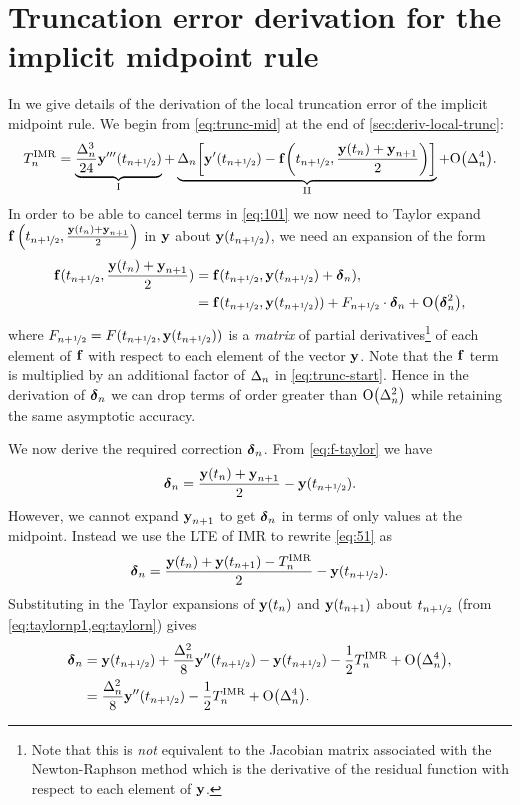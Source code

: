 \chapter{Truncation error derivation for the implicit midpoint rule}
\label{sec:full-imr-lte-calculation}

In  we give details of the derivation of the local truncation error of the implicit midpoint rule.
We begin from \cref{eq:trunc-mid} at the end of \cref{sec:deriv-local-trunc}:
\begin{equation}
  \lte^\imr = \underbrace{\frac{\dtn^3}{24} \yvhf[''']}_{\text{I}}
  + \underbrace{\dtn\bigs{ \yvhf['] - \ffv{\thf, \frac{\yv(t_n) + \yv_{n+1}}{2}} }}_{\text{II}}
  + \order{\dtn^4}.
  \label{eq:101}
\end{equation}
In order to be able to cancel terms in \cref{eq:101} we now need to Taylor expand ${\boldsymbol{\mathrm{f}}}\left( t_{n+\nicefrac{1}{2}}, \frac{\boldsymbol{\mathrm{y}}(t_n) + \boldsymbol{\mathrm{y}}_{n+1}}{2} \right)$ in $\boldsymbol{\mathrm{y}}$ about $\boldsymbol{\mathrm{y}}(t_{n+\nicefrac{1}{2}})$, \ie we need an expansion of the form
\begin{equation}
  \begin{aligned}
    \fv(\thf, \frac{\yv(t_n) + \yv_{n+1}}{2}) &= \fv(\thf, \yvhf + \dyn), \\
    &= \fv(\thf, \yvhf) + \dfdyhf \cdot \dyn  + \order{\dyn^2},
    \label{eq:f-taylor}
  \end{aligned}
\end{equation}
where $F_{n+\nicefrac{1}{2}} = F(t_{n+\nicefrac{1}{2}}, \boldsymbol{\mathrm{y}}(t_{n+\nicefrac{1}{2}}))$ is a \emph{matrix} of partial derivatives\footnote{Note that this is \emph{not} equivalent to the Jacobian matrix associated with the Newton-Raphson method which is the derivative of the residual function with respect to each element of $\boldsymbol{\mathrm{y}}$.} of each element of ${\boldsymbol{\mathrm{f}}}$ with respect to each element of the vector $\boldsymbol{\mathrm{y}}$.
Note that the ${\boldsymbol{\mathrm{f}}}$ term is multiplied by an additional factor of $\Delta_{n}$ in \cref{eq:trunc-start}.
Hence in the derivation of $\mbox{\boldmath$\delta$}_{n}$ we can drop terms of order greater than $\mathrm{O}{\left( \Delta_{n}^2 \right)}$ while retaining the same asymptotic accuracy.

We now derive the required correction $\mbox{\boldmath$\delta$}_{n}$.
From \cref{eq:f-taylor} we have
\begin{equation}
  \dyn = \frac{\yv(t_n) + \yv_{n+1}}{2} - \yvhf.
  \label{eq:51}
\end{equation}
However, we cannot expand $\boldsymbol{\mathrm{y}}_{n+1}$ to get $\mbox{\boldmath$\delta$}_{n}$ in terms of only values at the midpoint.
Instead we use the LTE of IMR to rewrite \cref{eq:51} as
\begin{equation}
  \mbox{\boldmath$\delta$}_{n} = \frac{\boldsymbol{\mathrm{y}}(t_n) + \boldsymbol{\mathrm{y}}(t_{n+1}) - T_n^{\mathrm{IMR}}}{2} - \boldsymbol{\mathrm{y}}(t_{n+\nicefrac{1}{2}}).
\end{equation}
Substituting in the Taylor expansions of $\boldsymbol{\mathrm{y}}(t_n)$ and $\boldsymbol{\mathrm{y}}(t_{n+1})$ about $t_{n+\nicefrac{1}{2}}$ (from \cref{eq:taylornp1,eq:taylorn}) gives
\begin{equation}
  \begin{aligned}
    \dyn &= \yvhf + \frac{\dtn^2}{8} \yvhf[''] - \yvhf - \frac{1}{2} \lte^\imr + \order{\dtn^4},\\
    &= \frac{\dtn^2}{8} \yvhf[''] - \frac{1}{2} \lte^\imr + \order{\dtn^4}.
    \label{eq:dy-value}
  \end{aligned}
\end{equation}

